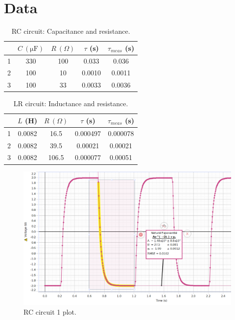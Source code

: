 \documentclass[12pt]{article}
\begin{document}
    \section{Data}
        \begin{table}[H]
            \centering
            \begin{tabular}{c|c|c|c|c}
                &\(C\ (\mathrm{\mu F})\) & \(R\ (\Omega)\) & \(\tau\) (s) & \(\tau_{meas}\) (s)\\
                \hline
                1&330 & 100 & 0.033 & 0.036 \\
                2&100 & 10 & 0.0010 & 0.0011\\
                3&100 & 33 & 0.0033 & 0.0036 \\
            \end{tabular}
            \caption{RC circuit: Capacitance and resistance.}
        \end{table}
        \begin{table}[H]
            \centering
            \begin{tabular}{c|c|c|c|c}
                &\(L\) (H) & \(R\ (\Omega)\) & \(\tau\) (s)& \(\tau_{meas}\) (s)\\
                \hline
                1&0.0082 & 16.5 & 0.000497 & 0.000078\\
                2&0.0082 & 39.5 & 0.00021 & 0.00021\\
                3&0.0082 & 106.5 & 0.000077 & 0.00051
            \end{tabular}
            \caption{LR circuit: Inductance and resistance.}
        \end{table}
        \begin{figure}[H]
            \centering
            \includegraphics[width=0.75\linewidth]{RC1.png}
            \caption{RC circuit 1 plot.}
        \end{figure}
\end{document}
